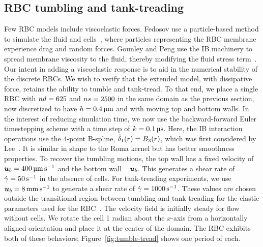 \subsection{RBC tumbling and tank-treading}

Few RBC models include viscoelastic forces. Fedosov  use a particle-based
method to simulate the fluid and cells~\cite{Fedosov:2010bc}, where particles
representing the RBC membrane experience drag and random forces. Gounley and Peng use the
IB machinery to spread membrane viscosity to the fluid, thereby modifying the fluid
stress term~\cite{Gounley:2015ho}. Our intent in adding a viscoelastic response is to aid
in the numerical stability of the discrete RBCs. We wish to verify that the extended
model, with dissipative force, retains the ability to tumble and tank-tread. To that end,
we place a single RBC with $\data\cardinality = 625$ and $\sample\cardinality = 2500$ in
the same domain as the previous section, now discretized to have $h = 0.4\um$ and with
moving top and bottom walls. In the interest of reducing simulation time, we now use the
backward-forward Euler timestepping scheme with a time step of $\timestep=0.1\us$. Here,
the IB interaction operations use the 4-point B-spline, $\hat{\delta}_1(r) = B_3(r)$, which was
first considered by Lee~\cite{Lee:2020tf}. It is similar in shape to the Roma kernel but
has better smoothness properties. To recover the tumbling motions, the top wall has a
fixed velocity of $\u_b=400\umpersec$ and the bottom wall $-\boldsymbol{u}_b$. This generates a shear
rate of $\shear=50\persec$ in the absence of cells.  For tank-treading experiments, we
use $\u_b = 8\mmpersec$ to generate a shear rate of $\shear=1000\persec$. These values
are chosen outside the transitional region between tumbling and tank-treading for the
elastic parameters used for the RBC~\cite{Kruger:2013ji}. The velocity field is initially
steady for flow without cells. We rotate the cell 1 radian about the $x$-axis from a
horizontally aligned orientation and place it at the center of the domain. The RBC
exhibits both of these behaviors; Figure~\ref{fig:tumble-tread} shows one period of each.

